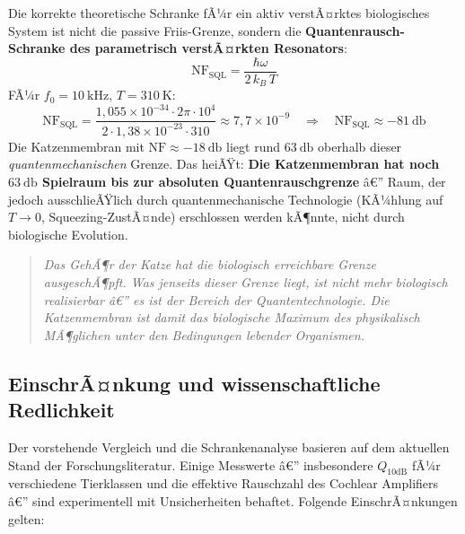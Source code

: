 ﻿\documentclass[12pt,a4paper,titlepage]{report}
\begin{document}
Die korrekte theoretische Schranke fÃ¼r ein aktiv verstÃ¤rktes biologisches System
ist nicht die passive Friis-Grenze, sondern die \textbf{Quantenrausch-Schranke
des parametrisch verstÃ¤rkten Resonators}:
\[
  \mathrm{NF}_{\text{SQL}} = \frac{\hbar\omega}{2\,k_B\,T}
\]
FÃ¼r $f_0 = \SI{10}{\kilo\hertz}$, $T = \SI{310}{\kelvin}$:
\[
  \mathrm{NF}_{\text{SQL}} = \frac{1{,}055\times10^{-34}\cdot 2\pi\cdot 10^4}
  {2\cdot1{,}38\times10^{-23}\cdot310}
  \approx 7{,}7\times10^{-9}
  \quad\Rightarrow\quad
  \mathrm{NF}_{\text{SQL}} \approx \SI{-81}{\decibel}
\]
Die Katzenmembran mit $\mathrm{NF} \approx \SI{-18}{\decibel}$ liegt
rund $\SI{63}{\decibel}$ oberhalb dieser \emph{quantenmechanischen} Grenze.
Das heiÃŸt: \textbf{Die Katzenmembran hat noch $\SI{63}{\decibel}$ Spielraum
bis zur absoluten Quantenrauschgrenze} â€” Raum, der jedoch ausschlieÃŸlich durch
quantenmechanische Technologie (KÃ¼hlung auf $T \to 0$, Squeezing-ZustÃ¤nde)
erschlossen werden kÃ¶nnte, nicht durch biologische Evolution.

\begin{quote}
  \itshape
  Das GehÃ¶r der Katze hat die biologisch erreichbare Grenze ausgeschÃ¶pft.
  Was jenseits dieser Grenze liegt, ist nicht mehr biologisch realisierbar â€”
  es ist der Bereich der Quantentechnologie.
  Die Katzenmembran ist damit das biologische Maximum des physikalisch MÃ¶glichen
  unter den Bedingungen lebender Organismen.
\end{quote}

\subsection{EinschrÃ¤nkung und wissenschaftliche Redlichkeit}

Der vorstehende Vergleich und die Schrankenanalyse basieren auf dem aktuellen
Stand der Forschungsliteratur. Einige Messwerte â€” insbesondere $Q_{10\text{dB}}$
fÃ¼r verschiedene Tierklassen und die effektive Rauschzahl des Cochlear Amplifiers â€”
sind experimentell mit Unsicherheiten behaftet. Folgende EinschrÃ¤nkungen gelten:
\end{document}
